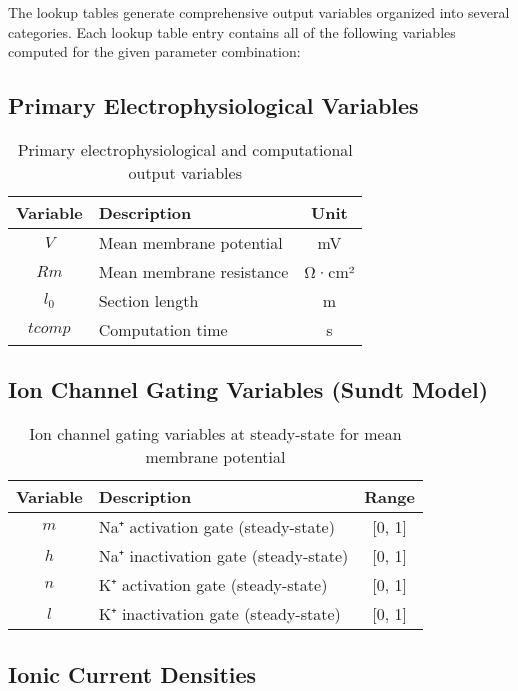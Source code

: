 \documentclass[11pt,a4paper]{article}
\begin{document}
The lookup tables generate comprehensive output variables organized into several categories. Each lookup table entry contains all of the following variables computed for the given parameter combination:

\subsection{Primary Electrophysiological Variables}

\begin{table}[h!]
\centering
\begin{tabular}{clc}
\toprule
\textbf{Variable} & \textbf{Description} & \textbf{Unit} \\
\midrule
$V$ & Mean membrane potential & mV \\
$Rm$ & Mean membrane resistance & Ω·cm² \\
$l_0$ & Section length & m \\
$tcomp$ & Computation time & s \\
\bottomrule
\end{tabular}
\caption{Primary electrophysiological and computational output variables}
\end{table}

\subsection{Ion Channel Gating Variables (Sundt Model)}

\begin{table}[h!]
\centering
\begin{tabular}{clc}
\toprule
\textbf{Variable} & \textbf{Description} & \textbf{Range} \\
\midrule
$m$ & Na⁺ activation gate (steady-state) & [0, 1] \\
$h$ & Na⁺ inactivation gate (steady-state) & [0, 1] \\
$n$ & K⁺ activation gate (steady-state) & [0, 1] \\
$l$ & K⁺ inactivation gate (steady-state) & [0, 1] \\
\bottomrule
\end{tabular}
\caption{Ion channel gating variables at steady-state for mean membrane potential}
\end{table}

\subsection{Ionic Current Densities}
\end{document}
